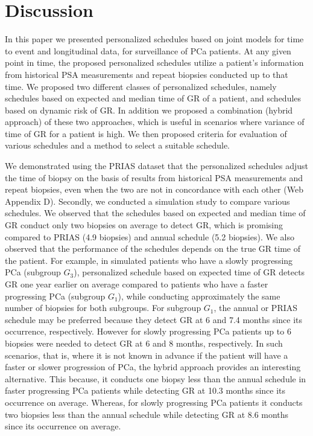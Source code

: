 
\section{Discussion}
\label{sec: discussion}
In this paper we presented personalized schedules based on joint models for time to event and longitudinal data, for surveillance of PCa patients. At any given point in time, the proposed personalized schedules utilize a patient's information from historical PSA measurements and repeat biopsies conducted up to that time. We proposed two different classes of personalized schedules, namely schedules based on expected and median time of GR of a patient, and schedules based on dynamic risk of GR. In addition we proposed a combination (hybrid approach) of these two approaches, which is useful in scenarios where variance of time of GR for a patient is high. We then proposed criteria for evaluation of various schedules and a method to select a suitable schedule.

We demonstrated using the PRIAS dataset that the personalized schedules adjust the time of biopsy on the basis of results from historical PSA measurements and repeat biopsies, even when the two are not in concordance with each other (Web Appendix D). Secondly, we conducted a simulation study to compare various schedules. We observed that the schedules based on expected and median time of GR conduct only two biopsies on average to detect GR, which is promising compared to PRIAS (4.9 biopsies) and annual schedule (5.2 biopsies). We also observed that the performance of the schedules depends on the true GR time of the patient. For example, in simulated patients who have a slowly progressing PCa (subgroup $G_3$), personalized schedule based on expected time of GR detects GR one year earlier on average compared to patients who have a faster progressing PCa (subgroup $G_1$), while conducting approximately the same number of biopsies for both subgroups. For subgroup $G_1$, the annual or PRIAS schedule may be preferred because they detect GR at 6 and 7.4 months since its occurrence, respectively. However for slowly progressing PCa patients up to 6 biopsies were needed to detect GR at 6 and 8 months, respectively. In such scenarios, that is, where it is not known in advance if the patient will have a faster or slower progression of PCa, the hybrid approach provides an interesting alternative. This because, it conducts one biopsy less than the annual schedule in faster progressing PCa patients while detecting GR at 10.3 months since its occurrence on average. Whereas, for slowly progressing PCa patients it conducts two biopsies less than the annual schedule while detecting GR at 8.6 months since its occurrence on average.

